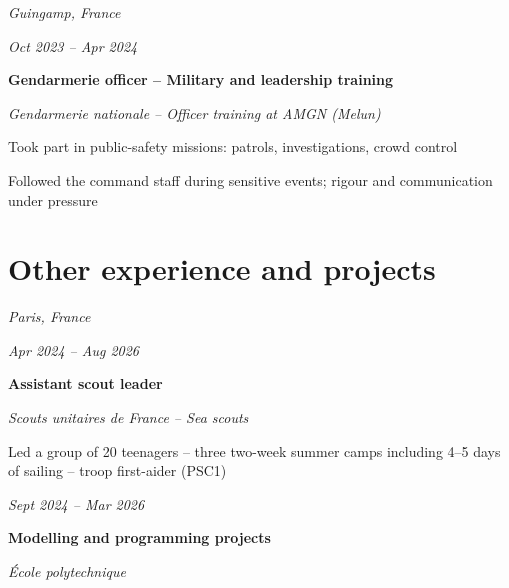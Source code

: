 \documentclass[10pt]{article}
\begin{document}
    \entrysep

    \begin{twocolentry}{
    \textit{Guingamp, France}

    \textit{Oct 2023 – Apr 2024}}
        \textbf{Gendarmerie officer -- Military and leadership training}

        \textit{Gendarmerie nationale -- Officer training at AMGN (Melun)}
    \end{twocolentry}

    \bulletsep
    \begin{onecolentry}
        \begin{highlights}
            \item Took part in public-safety missions: patrols, investigations, crowd control
            \item Followed the command staff during sensitive events; rigour and communication under pressure
        \end{highlights}
    \end{onecolentry}


\section{Other experience and projects}

    \begin{twocolentry}{
    \textit{Paris, France}

    \textit{Apr 2024 – Aug 2026}}
        \textbf{Assistant scout leader}

        \textit{Scouts unitaires de France -- Sea scouts}
    \end{twocolentry}

    \bulletsep
    \begin{onecolentry}
        \begin{highlights}
            \item Led a group of 20 teenagers -- three two-week summer camps including 4--5 days of sailing -- troop first-aider (PSC1)
        \end{highlights}
    \end{onecolentry}

    \entrysep

    \begin{twocolentry}{

    \textit{Sept 2024 – Mar 2026}}
        \textbf{Modelling and programming projects}

        \textit{École polytechnique}
    \end{twocolentry}
\end{document}
